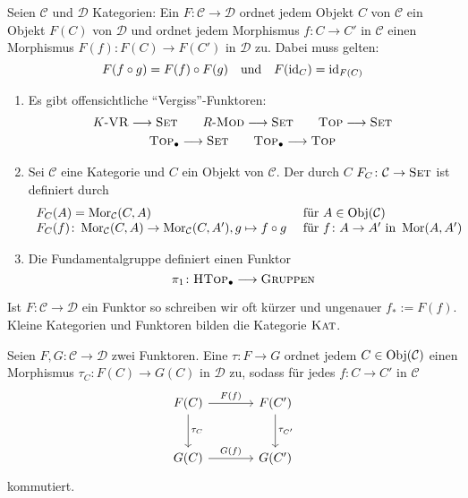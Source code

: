 \begin{definition}[{name=[Funktor]}]
	Seien $\mathcal{C}$ und $\mathcal{D}$ Kategorien: Ein  $F \colon \mathcal{C} \to \mathcal{D}$ ordnet jedem Objekt $C$ von $\mathcal{C}$ ein Objekt $F(C)$ von 
	$\mathcal{D}$ und ordnet jedem Morphismus $f : C \to C'$ in $\mathcal{C}$ einen Morphismus $F(f) \colon F(C) \to F(C')$ in $\mathcal{D}$ zu. Dabei muss gelten:
	\[
		F(f \circ g) = F(f) \circ F(g) \quad \text{und} \quad F(\operatorname{id}_C) = \operatorname{id}_{F(C)}
	\]
\end{definition}

\begin{beispiel}[{name=[Funktoren]}]
	\leavevmode
	\begin{enumerate}[(1)]
		\item Es gibt offensichtliche \enquote{Vergiss}-Funktoren:
		\begin{gather}
			K\text{-}\textsc{VR} \longrightarrow  \textsc{Set}\qquad  R\text{-}\textsc{Mod} \longrightarrow  \textsc{Set} \qquad \textsc{Top} \longrightarrow  \textsc{Set}\\
			\textsc{Top}_\bullet \longrightarrow  \textsc{Set}  \qquad 
			\textsc{Top}_\bullet \longrightarrow   \textsc{Top}
		\end{gather}
		\item Sei $\mathcal{C}$ eine Kategorie und $C$ ein Objekt von $\mathcal{C}$. 
		Der durch $C$  $F_C \colon \mathcal{C} \to \textsc{Set}$ ist definiert durch 
		\[
			\begin{array}{ll}
				F_C(A) = \operatorname{Mor}_\mathcal{C}(C,A) &\text{ für } A \in  \operatorname{Obj}(\mathcal{C}) \\
				F_C(f) \colon \operatorname{Mor}_\mathcal{C}(C,A) \to \operatorname{Mor}_\mathcal{C}(C,A'), g \mapsto f \circ  g &\text{ für } f \colon A \to A' \text{ in } \operatorname{Mor}(A,A')
			\end{array}
		\]
		\item Die Fundamentalgruppe definiert einen Funktor
		\[
			\pi_1 \colon \textsc{HTop}_\bullet \longrightarrow \textsc{Gruppen}
		\]
	\end{enumerate}
	Ist $F \colon \mathcal{C} \to \mathcal{D}$ ein Funktor so schreiben wir oft kürzer und ungenauer $f_* := F(f)$.
	Kleine Kategorien und Funktoren bilden die Kategorie $\textsc{Kat}$.
\end{beispiel}

\begin{definition}[{name=[natürliche Transformation]},label=def:16]
	Seien $F,G \colon \mathcal{C} \to \mathcal{D}$ zwei Funktoren. 
	Eine  $\tau \colon F \to G$ ordnet jedem $C \in \operatorname{Obj}(\mathcal{C})$ einen Morphismus $\tau_C \colon F(C) \to G(C)$ in $\mathcal{D}$ zu, sodass für jedes $f \colon C \to C'$ in $\mathcal{C}$
	\[
		\begin{tikzcd}[sep=large]
			F(C) \rar["F(f)"] \dar["\tau_C"]& F(C') \dar["\tau_{C'}"] \\
			G(C) \rar["G(f)"] & G(C')
		\end{tikzcd}
	\]
	kommutiert.
\end{definition}


